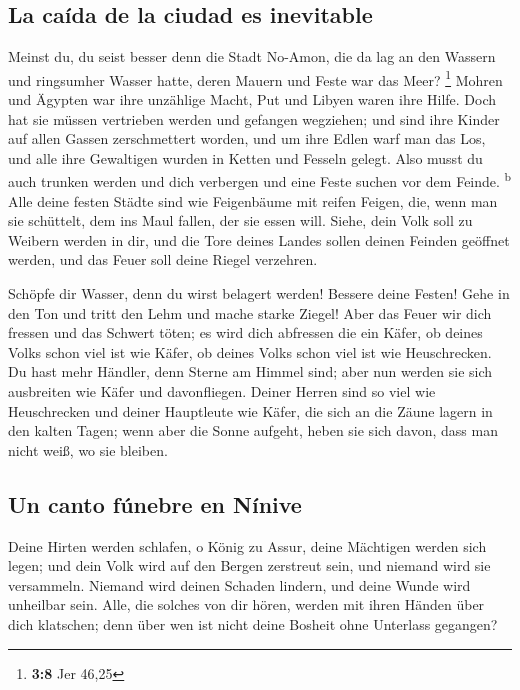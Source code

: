 \hypertarget{la-cauxedda-de-la-ciudad-es-inevitable}{%
\subsection{La caída de la ciudad es
inevitable}\label{la-cauxedda-de-la-ciudad-es-inevitable}}

 Meinst du, du seist besser denn die Stadt No-Amon, die da
lag an den Wassern und ringsumher Wasser hatte, deren Mauern und Feste
war das Meer? \footnote{\textbf{3:8} Jer 46,25}  Mohren
und Ägypten war ihre unzählige Macht, Put und Libyen waren ihre Hilfe.
 Doch hat sie müssen vertrieben werden und gefangen
wegziehen; und sind ihre Kinder auf allen Gassen zerschmettert worden,
und um ihre Edlen warf man das Los, und alle ihre Gewaltigen wurden in
Ketten und Fesseln gelegt.  Also musst du auch trunken
werden und dich verbergen und eine Feste suchen vor dem Feinde.
\textsuperscript{b}  Alle deine festen Städte sind wie
Feigenbäume mit reifen Feigen, die, wenn man sie schüttelt, dem ins Maul
fallen, der sie essen will.  Siehe, dein Volk soll zu
Weibern werden in dir, und die Tore deines Landes sollen deinen Feinden
geöffnet werden, und das Feuer soll deine Riegel verzehren.

 Schöpfe dir Wasser, denn du wirst belagert werden!
Bessere deine Festen! Gehe in den Ton und tritt den Lehm und mache
starke Ziegel!  Aber das Feuer wir dich fressen und das
Schwert töten; es wird dich abfressen die ein Käfer, ob deines Volks
schon viel ist wie Käfer, ob deines Volks schon viel ist wie
Heuschrecken.  Du hast mehr Händler, denn Sterne am
Himmel sind; aber nun werden sie sich ausbreiten wie Käfer und
davonfliegen.  Deiner Herren sind so viel wie
Heuschrecken und deiner Hauptleute wie Käfer, die sich an die Zäune
lagern in den kalten Tagen; wenn aber die Sonne aufgeht, heben sie sich
davon, dass man nicht weiß, wo sie bleiben.

\hypertarget{un-canto-fuxfanebre-en-nuxednive}{%
\subsection{Un canto fúnebre en
Nínive}\label{un-canto-fuxfanebre-en-nuxednive}}

 Deine Hirten werden schlafen, o König zu Assur, deine
Mächtigen werden sich legen; und dein Volk wird auf den Bergen zerstreut
sein, und niemand wird sie versammeln.  Niemand wird
deinen Schaden lindern, und deine Wunde wird unheilbar sein. Alle, die
solches von dir hören, werden mit ihren Händen über dich klatschen; denn
über wen ist nicht deine Bosheit ohne Unterlass gegangen?
